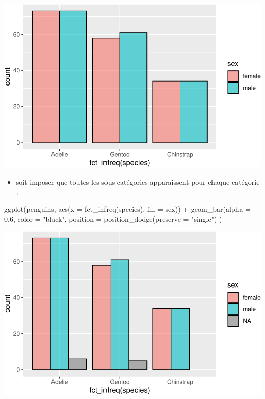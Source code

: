 \documentclass[
  a4paper,
  DIV=11,
  numbers=noendperiod,
  oneside]{scrreprt}
\newenvironment{Shaded}{}{}
\newcommand{\AttributeTok}[1]{\textcolor[rgb]{0.84,0.23,0.29}{#1}}
\newcommand{\FloatTok}[1]{\textcolor[rgb]{0.00,0.36,0.77}{#1}}
\newcommand{\FunctionTok}[1]{\textcolor[rgb]{0.44,0.26,0.76}{#1}}
\newcommand{\NormalTok}[1]{\textcolor[rgb]{0.14,0.16,0.18}{#1}}
\newcommand{\SpecialCharTok}[1]{\textcolor[rgb]{0.00,0.36,0.77}{#1}}
\newcommand{\StringTok}[1]{\textcolor[rgb]{0.01,0.18,0.38}{#1}}
\providecommand{\tightlist}{%
  \setlength{\itemsep}{0pt}\setlength{\parskip}{0pt}}\usepackage{longtable,booktabs,array}
\begin{document}
\includegraphics{03-visualization_files/figure-pdf/unnamed-chunk-59-1.pdf}

\begin{itemize}
\tightlist
\item
  soit imposer que toutes les sous-catégories apparaissent pour chaque
  catégorie :
\end{itemize}

\begin{Shaded}
\begin{Highlighting}[]
\FunctionTok{ggplot}\NormalTok{(penguins, }\FunctionTok{aes}\NormalTok{(}\AttributeTok{x =} \FunctionTok{fct\_infreq}\NormalTok{(species), }\AttributeTok{fill =}\NormalTok{ sex)) }\SpecialCharTok{+}
  \FunctionTok{geom\_bar}\NormalTok{(}\AttributeTok{alpha =} \FloatTok{0.6}\NormalTok{, }\AttributeTok{color =} \StringTok{"black"}\NormalTok{,}
           \AttributeTok{position =} \FunctionTok{position\_dodge}\NormalTok{(}\AttributeTok{preserve =} \StringTok{"single"}\NormalTok{) )}
\end{Highlighting}
\end{Shaded}

\includegraphics{03-visualization_files/figure-pdf/unnamed-chunk-60-1.pdf}
\end{document}
